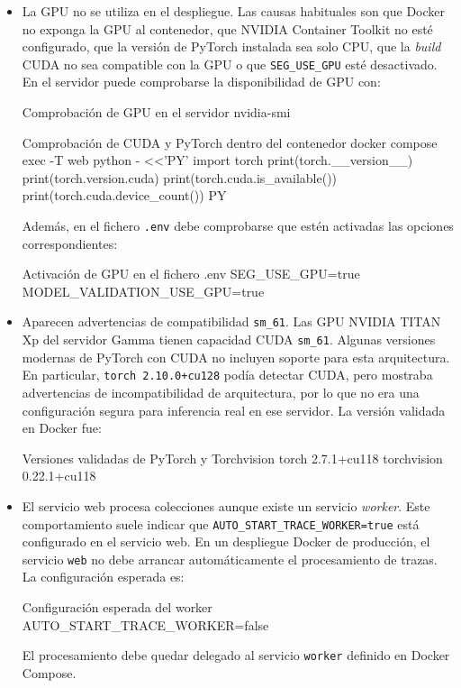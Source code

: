 \begin{itemize}
	\item La GPU no se utiliza en el despliegue. Las causas habituales son que Docker no exponga la GPU al contenedor, que NVIDIA Container Toolkit no esté configurado, que la versión de PyTorch instalada sea solo CPU, que la \textit{build} CUDA no sea compatible con la GPU o que \texttt{SEG\_USE\_GPU} esté desactivado. En el servidor puede comprobarse la disponibilidad de GPU con:
	
	\begin{dockerboxnf}{Comprobación de GPU en el servidor}
nvidia-smi
	\end{dockerboxnf}

	\begin{dockerboxnf}{Comprobación de CUDA y PyTorch dentro del contenedor}
docker compose exec -T web python - <<'PY'
import torch
print(torch.__version__)
print(torch.version.cuda)
print(torch.cuda.is_available())
print(torch.cuda.device_count())
PY
	\end{dockerboxnf}
	
	Además, en el fichero \texttt{.env} debe comprobarse que estén activadas las opciones correspondientes:
	
	\begin{infocmdboxnf}{Activación de GPU en el fichero .env}
SEG_USE_GPU=true
MODEL_VALIDATION_USE_GPU=true
	\end{infocmdboxnf}
	
	\item Aparecen advertencias de compatibilidad \texttt{sm\_61}. Las GPU NVIDIA TITAN Xp del servidor Gamma tienen capacidad CUDA \texttt{sm\_61}. Algunas versiones modernas de PyTorch con CUDA no incluyen soporte para esta arquitectura. En particular, \texttt{torch 2.10.0+cu128} podía detectar CUDA, pero mostraba advertencias de incompatibilidad de arquitectura, por lo que no era una configuración segura para inferencia real en ese servidor. La versión validada en Docker fue:
	
	\begin{infocmdboxnf}{Versiones validadas de PyTorch y Torchvision}
torch 2.7.1+cu118
torchvision 0.22.1+cu118
	\end{infocmdboxnf}
	
	\item El servicio web procesa colecciones aunque existe un servicio \textit{worker}. Este comportamiento suele indicar que \texttt{AUTO\_START\_TRACE\_WORKER=true} está configurado en el servicio web. En un despliegue Docker de producción, el servicio \texttt{web} no debe arrancar automáticamente el procesamiento de trazas. La configuración esperada es:
	
	\begin{infocmdboxnf}{Configuración esperada del worker}
AUTO_START_TRACE_WORKER=false
	\end{infocmdboxnf}
	
	El procesamiento debe quedar delegado al servicio \texttt{worker} definido en Docker Compose.
\end{itemize}

